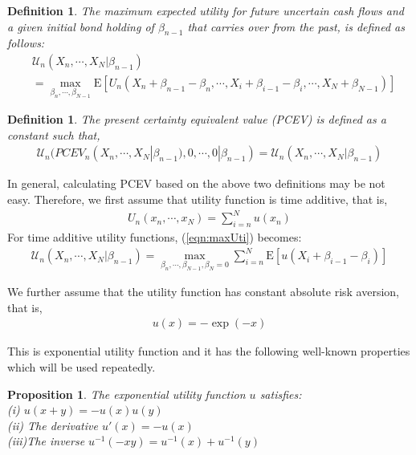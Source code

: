 \documentclass{article}[12pt letter]
\newtheorem{definition}[theorem]{Definition}
\newtheorem{proposition}[theorem]{Proposition}
\newcommand{\E}{\mathrm{E}}
\begin{document}
\begin{definition} The maximum expected utility for future uncertain cash flows and a given initial bond holding of $\beta_{n-1}$ that carries over from the past, is defined as follows:
\begin{align} \label{eqn:maxUti}
    &\mathcal{U}_n(X_n,\cdots, X_{N}|\beta_{n-1}) \nonumber \\
    & = \max_{\beta_n, \cdots, \beta_{N-1}} \E [U_n(X_n+\beta_{n-1}-\beta_n, \cdots, X_i + \beta_{i-1}-\beta_i, \cdots, X_N + \beta_{N-1}) ]
\end{align}
\end{definition}

\begin{definition} The present certainty equivalent value (PCEV) is defined as a constant such that,
\begin{align} \label{eqn:PCEV}
    \mathcal{U}_n(PCEV_n(X_n, \cdots, X_N|\beta_{n-1}), 0,\cdots,0|\beta_{n-1})=\mathcal{U}_n(X_n,\cdots, X_{N}|\beta_{n-1})
\end{align}
\end{definition}
In general, calculating PCEV based on the above two definitions may be not easy. Therefore, we first assume that  utility function is time additive, that is,
\begin{align}\label{eqn:addUti}
 U_n(x_n, \cdots, x_{N}) = \sum_{i = n}^Nu(x_n)
\end{align}
For time additive utility functions,  (\ref{eqn:maxUti}) becomes:
\begin{align} \label{eqn:maxAddUti}
    \mathcal{U}_n(X_n,\cdots, X_{N}|\beta_{n-1}) = \max_{\beta_n, \cdots, \beta_{N-1},\beta_N = 0} \sum_{i=n}^N  \E [ u( X_i + \beta_{i-1}-\beta_i)]
\end{align}


We further assume that the utility function has constant absolute risk aversion, that is,
\begin{align}\label{eqn:expUti}
u(x) = -\exp(-x)\end{align}

This is exponential utility function and it has the following well-known properties which will be used repeatedly. 
\begin{proposition} \label{prop:exp}
The exponential utility function $u$ satisfies: \\
(i) $u(x+y) = -u(x)u(y)$ \\
(ii) The derivative $u' (x) = -u(x)$ \\
(iii)The inverse $u^{-1}(-xy) = u^{-1} (x) + u^{-1} (y)$
\end{proposition}
\end{document}
